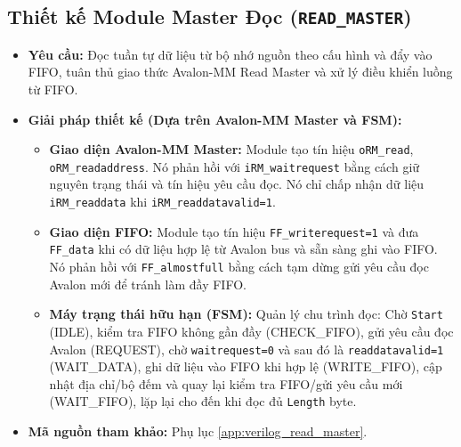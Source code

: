 \subsection{Thiết kế Module Master Đọc (\texttt{READ\_MASTER})}
\begin{itemize}
    \item \textbf{Yêu cầu:} Đọc tuần tự dữ liệu từ bộ nhớ nguồn theo cấu hình và đẩy vào FIFO, tuân thủ giao thức Avalon-MM Read Master và xử lý điều khiển luồng từ FIFO.
    \item \textbf{Giải pháp thiết kế (Dựa trên Avalon-MM Master và FSM):}
        \begin{itemize}
            \item \textbf{Giao diện Avalon-MM Master:} Module tạo tín hiệu \texttt{oRM\_read}, \texttt{oRM\_readaddress}. Nó phản hồi với \texttt{iRM\_waitrequest} bằng cách giữ nguyên trạng thái và tín hiệu yêu cầu đọc. Nó chỉ chấp nhận dữ liệu \texttt{iRM\_readdata} khi \texttt{iRM\_readdatavalid=1}.
            \item \textbf{Giao diện FIFO:} Module tạo tín hiệu \texttt{FF\_writerequest=1} và đưa \texttt{FF\_data} khi có dữ liệu hợp lệ từ Avalon bus và sẵn sàng ghi vào FIFO. Nó phản hồi với \texttt{FF\_almostfull} bằng cách tạm dừng gửi yêu cầu đọc Avalon mới để tránh làm đầy FIFO.
            \item \textbf{Máy trạng thái hữu hạn (FSM):} Quản lý chu trình đọc: Chờ \texttt{Start} (IDLE), kiểm tra FIFO không gần đầy (CHECK\_FIFO), gửi yêu cầu đọc Avalon (REQUEST), chờ \texttt{waitrequest=0} và sau đó là \texttt{readdatavalid=1} (WAIT\_DATA), ghi dữ liệu vào FIFO khi hợp lệ (WRITE\_FIFO), cập nhật địa chỉ/bộ đếm và quay lại kiểm tra FIFO/gửi yêu cầu mới (WAIT\_FIFO), lặp lại cho đến khi đọc đủ \texttt{Length} byte.
        \end{itemize}
    \item \textbf{Mã nguồn tham khảo:} Phụ lục \ref{app:verilog_read_master}.
\end{itemize}


